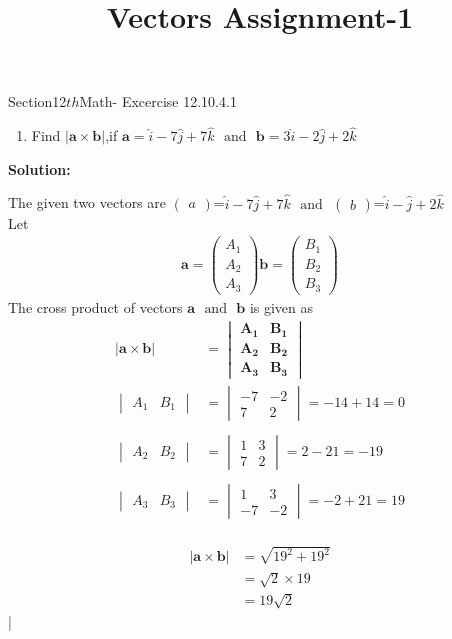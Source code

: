 \documentclass[12pt]{article}
\newcommand{\mydet}[1]{\ensuremath{\begin{vmatrix}#1\end{vmatrix}}}
\providecommand{\abs}[1]{\left\vert#1\right\vert}
\newcommand{\solution}{\noindent \textbf{Solution: }}
\newcommand{\myvec}[1]{\ensuremath{\begin{pmatrix}#1\end{pmatrix}}}
\let\vec\mathbf
\begin{document}
\begin{center}\title{\textbf{Vectors Assignment-1}}
\date{\vspace{-5ex}}
\maketitle
\end{center}
Section{12${th}$Math- Excercise 12.10.4.1}

\begin{enumerate}
\item Find $\abs{\vec{a}\times\vec{b}}$,if $\vec{a}=\hat{i}-7\hat{j}+7\hat{k}$ $\text{ and } $ $\vec{b}=3\hat{i}-2\hat{j}+2\hat{k}$
\end{enumerate}

\solution

The given two vectors are $\myvec{a}$=$\hat{i}-7\hat{j}+7\hat{k}$  $\text{ and }$  $\myvec{b}$=$\hat{i}-\hat{j}+2\hat{k}$ \\
 Let 
	\begin{align}
		\vec{a}=\myvec{A_1\\A_2\\A_3}
		\vec{b}=\myvec{B_1\\B_2\\B_3}
	\end{align}
The cross product of vectors $\vec{a}$ $\text{ and }$ $\vec{b}$ is given as
\begin{align}
	\abs{\vec{a}\times\vec{b}}&=\mydet{\vec{A_1}& \vec{B_1} \\ \vec{A_2} & \vec{B_2} \\\vec{A_3} & \vec{B_3}}\\
\mydet{A_1&B_1}&=\mydet{-7 & -2 \\ 7 & 2}=-14+14=0\\\\
\mydet{A_2&B_2}&=\mydet{1 & 3 \\ 7 & 2}=2-21=-19\\\\
\mydet{A_3&B_3}&=\mydet{1 & 3 \\ -7 & -2}=-2+21=19\\
\end{align}

\begin{align}
	\abs{\vec{a}\times\vec{b}}&=\sqrt{19^2+19^2}\\
&=\sqrt{2}\times19\\
&=19\sqrt{2}
\end{align}|
\end{document}
